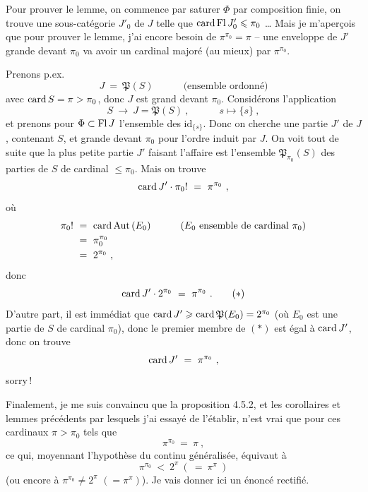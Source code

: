 
Pour prouver le lemme, on commence par saturer $\Phi$ par composition finie, on trouve une sous-catégorie $J'_0$ de $J$ telle que $\operatorname{card}\operatorname{Fl} J'_0 \leqslant \pi_0$ \ldots{} Mais je m'aperçois que pour prouver le lemme, j'ai encore besoin de $\pi^{\pi_0} = \pi$ -- une enveloppe de $J'$ grande devant $\pi_0$ va avoir un cardinal majoré (au mieux) par $\pi^{\pi_0}$.

Prenons p.ex.
\[
J \ =\ \mathfrak{P}(S) \qquad\quad \text{(ensemble ordonné)}
\]
avec $\operatorname{card} S = \pi > \pi_0$, donc $J$ est grand devant $\pi_0$. Considérons l'application
\[
S \ \longrightarrow\ J = \mathfrak{P}(S)\ , \qquad\quad s \longmapsto \{s\}\ ,
\]
et prenons pour $\Phi \subset \operatorname{Fl} J$ l'ensemble des $\mathrm{id}_{\{s\}}$. Donc on cherche une partie $J'$ de $J$, contenant $S$, et grande devant $\pi_0$ pour l'ordre induit par $J$. On voit tout de suite que la plus petite partie $J'$ faisant l'affaire est l'ensemble $\mathfrak{P}_{\pi_0}(S)$ des parties de $S$ de cardinal $\leqslant \pi_0$. Mais on trouve
\[
\card J' \cdot \pi_0! \ =\ \pi^{\pi_0}\ ,
\]
où
\[
\begin{aligned}
\pi_0! \ &=\ \operatorname{card}\operatorname{Aut}\,(E_0) \qquad\quad (E_0 \text{ ensemble de cardinal } \pi_0)\\
&=\ \pi_0^{\pi_0}\\
&=\ 2^{\pi_0}\ ,
\end{aligned}
\]
donc
\[
\card J' \cdot 2^{\pi_0} \ =\ \pi^{\pi_0}\ .
\tag*{$(*)$}
\]
D'autre part, il est immédiat que $\operatorname{card} J' \geqslant \operatorname{card}\mathfrak{P}(E_0) = 2^{\pi_0}$ (où $E_0$ est une partie de $S$ de cardinal $\pi_0$), donc le premier membre de $(*)$ est égal à $\operatorname{card} J'$, donc on trouve
\[
\operatorname{card} J' \ =\ \pi^{\pi_0}\ ,
\]
sorry\,!

Finalement, je me suis convaincu que la proposition 4.5.2, et les corollaires et lemmes précédents par lesquels j'ai essayé de l'établir, n'est vrai que pour ces cardinaux $\pi > \pi_0$ tels que
\[
\pi^{\pi_0} \ =\ \pi\ ,
\]
ce qui, moyennant l'hypothèse du continu généralisée, équivaut à
\[
\pi^{\pi_0} \ <\ 2^{\pi}\ (\ =\ \pi^{\pi}\ )
\]
(ou encore à $\pi^{\pi_0} \neq 2^{\pi}$ $(= \pi^{\pi})$). Je vais donner
ici un énoncé rectifié.


